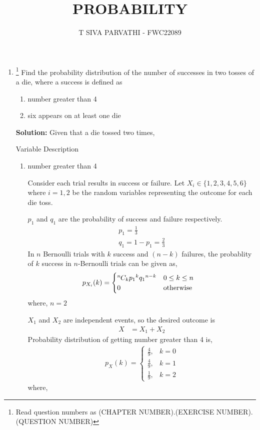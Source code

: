 \documentclass{article}
\newcommand{\solution}{\noindent \textbf{Solution: }}
\newcommand*{\permcomb}[4][0mu]{{{}^{#3}\mkern#1#2_{#4}}}
\newcommand*{\comb}[1][-1mu]{\permcomb[#1]{C}}
\begin{document}
\title{PROBABILITY}
\author{\Large T SIVA PARVATHI - FWC22089}
\date{}

\maketitle
\begin{enumerate}[label=13.\arabic{enumi}.\arabic{enumii}]%
\setcounter{enumi}{3}
\setcounter{enumii}{5}

\item \footnote{Read question numbers as (CHAPTER NUMBER).(EXERCISE NUMBER).(QUESTION NUMBER)}
Find the probability distribution of the number of successes in two tosses of a die, where a success is defined as
\begin{enumerate}
\item number greater than 4
\item six appears on at least one die
\end{enumerate}

\solution
Given that a die tossed two times,
\begin{table}[h]\centering
	
	 \caption{Variable Description}\label{tab:}
\end{table}
\begin{enumerate}
\item number greater than 4

Consider each trial results in success or failure. Let $X_i\in\{1,2,3,4,5,6\}$ where $i = 1,2$ be the random variables representing the outcome for each die toss. 

$p_1$ and $q_1$ are the probability of success and failure respectively.
\begin{align}
p_1 = \frac{1}{3}\\           
q_1 = 1 - p_1 = \frac{2}{3}     
\end{align}
In $n$ Bernoulli trials with $k$ success and $(n - k)$ failures, the probablity of $k$ success in $n$-Bernoulli trials can be given as,
\begin{align}
p_{X_i}(k) &= 
\begin{cases}
\comb{n}{k}{p_1}^{k}{q_1}^{n-k} & 0 \le k \le n\\
0 & \text{otherwise}                
\end{cases}
\end{align}
where, $n = 2$

$X_1$ and $X_2$ are independent events, so the desired outcome is
\begin{align}
X&=X_1+X_2
\end{align}
Probability distribution of getting number greater than 4 is,
\begin{align}
  p_X(k) =
    \begin{cases}
      \frac{4}{9}, &  k = 0\\
      \frac{4}{9}, & k = 1\\
      \frac{1}{9}, & k = 2
    \end{cases}       
\end{align}
where, 


\end{enumerate}
\end{enumerate}
\end{document}
